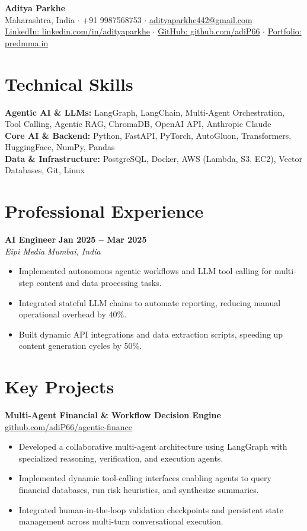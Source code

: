 \documentclass[10pt,a4paper]{article}
\begin{document}
\begin{center}
    {\LARGE \textbf{Aditya Parkhe}} \\[3pt]
    \small Maharashtra, India \; $\cdot$ \; +91 9987568753 \; $\cdot$ \; \href{mailto:adityaparkhe442@gmail.com}{adityaparkhe442@gmail.com} \\[2pt]
    \href{https://linkedin.com/in/adityaparkhe}{LinkedIn: linkedin.com/in/adityaparkhe} \; $\cdot$ \; \href{https://github.com/adiP66}{GitHub: github.com/adiP66} \; $\cdot$ \; \href{https://predmma.in}{Portfolio: predmma.in}
\end{center}

\section*{Technical Skills}
\textbf{Agentic AI \& LLMs:} LangGraph, LangChain, Multi-Agent Orchestration, Tool Calling, Agentic RAG, ChromaDB, OpenAI API, Anthropic Claude \\
\textbf{Core AI \& Backend:} Python, FastAPI, PyTorch, AutoGluon, Transformers, HuggingFace, NumPy, Pandas \\
\textbf{Data \& Infrastructure:} PostgreSQL, Docker, AWS (Lambda, S3, EC2), Vector Databases, Git, Linux

\section*{Professional Experience}
\textbf{AI Engineer} \hfill \textbf{Jan 2025 -- Mar 2025} \\
\textit{Eipi Media} \hfill \textit{Mumbai, India}
\begin{itemize}
    \item Implemented autonomous agentic workflows and LLM tool calling for multi-step content and data processing tasks.
    \item Integrated stateful LLM chains to automate reporting, reducing manual operational overhead by 40\%.
    \item Built dynamic API integrations and data extraction scripts, speeding up content generation cycles by 50\%.
\end{itemize}

\section*{Key Projects}
\textbf{Multi-Agent Financial \& Workflow Decision Engine} \hfill \href{https://github.com/adiP66}{github.com/adiP66/agentic-finance}
\begin{itemize}
    \item Developed a collaborative multi-agent architecture using LangGraph with specialized reasoning, verification, and execution agents.
    \item Implemented dynamic tool-calling interfaces enabling agents to query financial databases, run risk heuristics, and synthesize summaries.
    \item Integrated human-in-the-loop validation checkpoints and persistent state management across multi-turn conversational execution.
\end{itemize}
\end{document}
